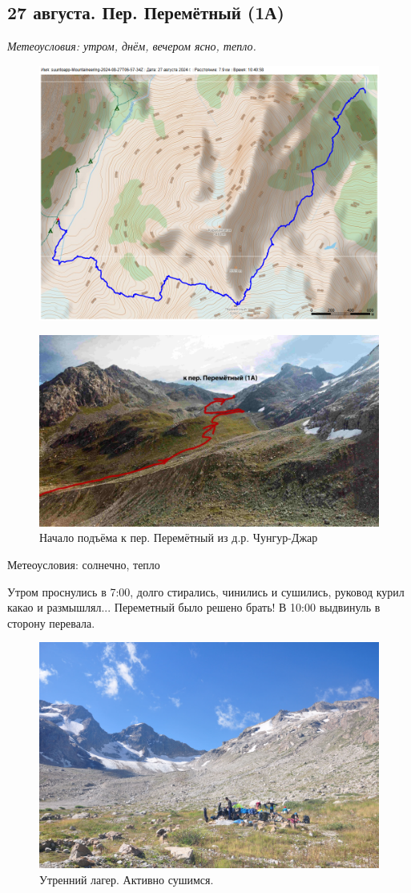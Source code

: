 \subsection{27 августа. Пер. Перемётный (1А)}
\textit{Метеоусловия: утром, днём, вечером ясно, тепло.}

\begin{figure}[h!]
	\centering
	\includegraphics[angle=0, width=0.7\linewidth]{../pics/mini_maps/27}
	\label{fig:mini_27}
\end{figure}




\begin{figure}[h!]
	\centering
	\includegraphics[width=0.7\linewidth]{../pics/perem_1}
	\caption{Начало подъёма к пер. Перемётный из д.р. Чунгур-Джар}
	\label{fig:perem_1}
\end{figure} 


Метеоусловия: солнечно, тепло

Утром проснулись в 7:00, долго стирались, чинились и сушились, руковод курил какао и размышлял... Переметный было решено брать!
В 10:00 выдвинуль в сторону перевала.

\begin{figure}[h!]
	\centering
	\includegraphics[width=0.7\linewidth]{../pics/DSC_0251.jpg}
	\caption{Утренний лагер. Активно сушимся.}
	\label{fig:DSC_0251}
\end{figure}

